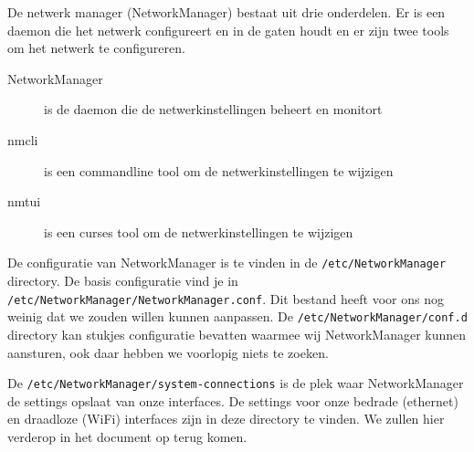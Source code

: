 De netwerk manager (NetworkManager) bestaat uit drie onderdelen. Er is een daemon die het netwerk configureert en in de gaten houdt en er zijn twee tools om het netwerk te configureren.
\begin{description}
\item[NetworkManager] is de daemon die de netwerkinstellingen beheert en monitort
\item[nmcli] is een commandline tool om de netwerkinstellingen te wijzigen
\item[nmtui] is een curses tool om de netwerkinstellingen te wijzigen
\end{description}

De configuratie van NetworkManager is te vinden in de \texttt{/etc/NetworkManager} directory. De basis configuratie vind je in \texttt{/etc/NetworkManager/NetworkManager.conf}. Dit bestand heeft voor ons nog weinig dat we zouden willen kunnen aanpassen. De \texttt{/etc/NetworkManager/conf.d} directory kan stukjes configuratie bevatten waarmee wij NetworkManager kunnen aansturen, ook daar hebben we voorlopig niets te zoeken.

De \texttt{/etc/NetworkManager/system-connections} is de plek waar NetworkManager de settings opslaat van onze interfaces. De settings voor onze bedrade (ethernet) en draadloze (WiFi) interfaces zijn in deze directory te vinden. We zullen hier verderop in het document op terug komen.

